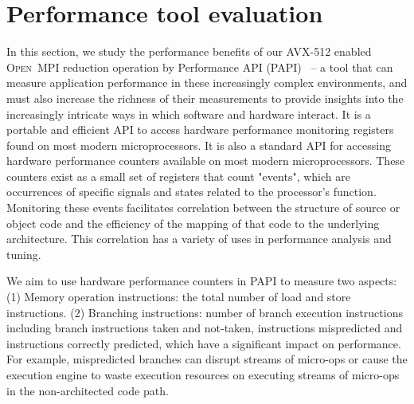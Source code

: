 \documentclass[sigconf]{acmart}
\newcommand{\ompi}[0]{\textsc{Open~MPI}\xspace}
\begin{document}
\section{Performance tool evaluation}\label{sec:perf}
In this section, we study the performance benefits of our AVX-512 enabled \ompi reduction
operation by Performance API (PAPI)~\cite{papi} -- a tool that can measure
application performance in these increasingly complex environments, and must also
increase the richness of their measurements to provide insights into the
increasingly intricate ways in which software and hardware interact.
It is a portable and efficient API to access hardware performance
monitoring registers found on most modern microprocessors.
It is also a standard API for accessing hardware
performance counters available on most modern microprocessors. These counters exist
as a small set of registers that count "events", which are occurrences of specific signals
and states related to the processor's function. Monitoring these events facilitates
correlation between the structure of source or object code and the efficiency of the mapping
of that code to the underlying architecture. This correlation has a variety of uses in
performance analysis and tuning.


We aim to use hardware performance counters in PAPI to measure two aspects:
(1) Memory operation instructions: the total number of load and store instructions.
(2) Branching instructions: number of branch execution instructions including branch instructions taken and not-taken,
instructions mispredicted and instructions correctly predicted, which have a significant impact on performance.
For example, mispredicted branches can disrupt streams of micro-ops or cause
the execution engine to waste execution resources on executing
streams of micro-ops in the non-architected code path.
\end{document}
